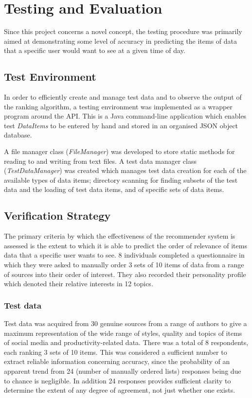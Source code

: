 \chapter{Testing and Evaluation}

Since this project concerns a novel concept, the testing procedure was primarily aimed at demonstrating some level of accuracy in predicting the items of data that a specific user would want to see at a given time of day.

\section{Test Environment}

In order to efficiently create and manage test data and to observe the output of the ranking algorithm, a testing environment was implemented as a wrapper program around the API. This is a Java command-line application which enables test \emph{DataItems} to be entered by hand and stored in an organised JSON object database.

A file manager class (\emph{FileManager}) was developed to store static methods for reading to and writing from text files. A test data manager class (\emph{TestDataManager}) was created which manages test data creation for each of the available types of data items; directory scanning for finding subsets of the test data and the loading of test data items, and of specific sets of data items.

\section{Verification Strategy}

The primary criteria by which the effectiveness of the recommender system is assessed is the extent to which it is able to predict the order of relevance of items data that a specific user wants to see. 8 individuals completed a questionnaire in which they were asked to manually order 3 sets of 10 items of data from a range of sources into their order of interest. They also recorded their personality profile which denoted their relative interests in 12 topics. 

\subsection{Test data}

Test data was acquired from 30 genuine sources from a range of authors to give a maximum representation of the wide range of styles, quality and topics of items of social media and productivity-related data. There was a total of 8 respondents, each ranking 3 sets of 10 items. This was considered a sufficient number to extract reliable information concerning accuracy, since the probability of an apparent trend from 24 (number of manually ordered lists) responses being due to chance is negligible. In addition 24 responses provides sufficient clarity to determine the extent of any degree of agreement, not just whether one exists. 

